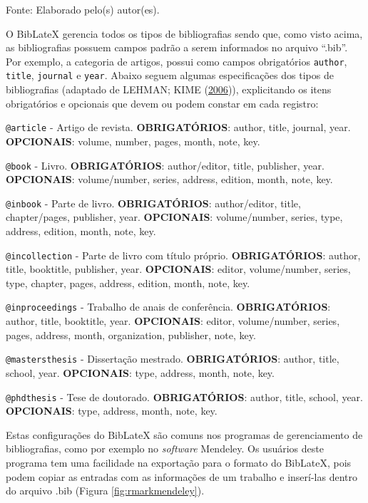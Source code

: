 \documentclass[12pt,brazil,oneside]{book}
\begin{document}
Fonte: Elaborado pelo(s) autor(es).

O BibLateX gerencia todos os tipos de bibliografias sendo que, como
visto acima, as bibliografias possuem campos padrão a serem informados
no arquivo ``.bib''. Por exemplo, a categoria de artigos, possui como
campos obrigatórios \texttt{author}, \texttt{title}, \texttt{journal} e
\texttt{year}. Abaixo seguem algumas especificações dos tipos de
bibliografias (adaptado de LEHMAN; KIME
(\protect\hyperlink{ref-biblatex}{2006})), explicitando os itens
obrigatórios e opcionais que devem ou podem constar em cada registro:

\texttt{@article} - Artigo de revista. \textbf{OBRIGATÓRIOS}: author,
title, journal, year. \textbf{OPCIONAIS}: volume, number, pages, month,
note, key.

\texttt{@book} - Livro. \textbf{OBRIGATÓRIOS}: author/editor, title,
publisher, year. \textbf{OPCIONAIS}: volume/number, series, address,
edition, month, note, key.

\texttt{@inbook} - Parte de livro. \textbf{OBRIGATÓRIOS}: author/editor,
title, chapter/pages, publisher, year. \textbf{OPCIONAIS}:
volume/number, series, type, address, edition, month, note, key.

\texttt{@incollection} - Parte de livro com título próprio.
\textbf{OBRIGATÓRIOS}: author, title, booktitle, publisher, year.
\textbf{OPCIONAIS}: editor, volume/number, series, type, chapter, pages,
address, edition, month, note, key.

\texttt{@inproceedings} - Trabalho de anais de conferência.
\textbf{OBRIGATÓRIOS}: author, title, booktitle, year.
\textbf{OPCIONAIS}: editor, volume/number, series, pages, address,
month, organization, publisher, note, key.

\texttt{@mastersthesis} - Dissertação mestrado. \textbf{OBRIGATÓRIOS}:
author, title, school, year. \textbf{OPCIONAIS}: type, address, month,
note, key.

\texttt{@phdthesis} - Tese de doutorado. \textbf{OBRIGATÓRIOS}: author,
title, school, year. \textbf{OPCIONAIS}: type, address, month, note,
key.

Estas configurações do BibLateX são comuns nos programas de
gerenciamento de bibliografias, como por exemplo no \emph{software}
Mendeley. Os usuários deste programa tem uma facilidade na exportação
para o formato do BibLateX, pois podem copiar as entradas com as
informações de um trabalho e inserí-las dentro do arquivo .bib (Figura
\ref{fig:rmarkmendeley}).
\end{document}

